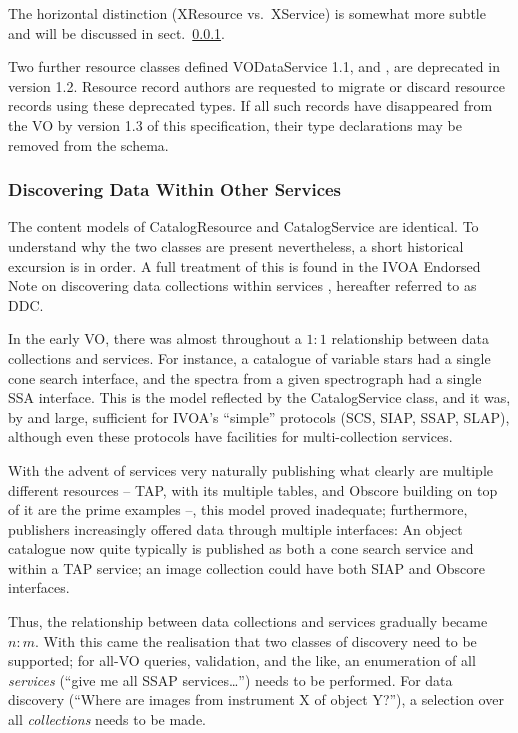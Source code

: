 \documentclass[11pt,a4paper]{ivoa}
\begin{document}
The horizontal distinction (XResource vs.~XService) is somewhat more
subtle and will be discussed in sect.~\ref{sect:discoverdata}.

Two further resource classes defined VODataService 1.1,
 and ,
are deprecated in version 1.2.
Resource record authors are requested to migrate or discard resource
records using these deprecated types.  If all such records have
disappeared from the VO by version 1.3 of this specification, their
type declarations may be removed from the schema.

\subsubsection{Discovering Data Within Other Services}
\label{sect:discoverdata}

The content models of CatalogResource and CatalogService are identical.
To understand why the two classes are present nevertheless, a short
historical excursion is in order.  A full treatment of this is found in
the IVOA Endorsed Note on discovering data collections within services
\citep{2019ivoa.spec.0520D}, hereafter referred to as DDC.

In the early VO, there was almost throughout a $1:1$ relationship between
data collections and services.  For instance, a catalogue of variable
stars had a single cone search interface, and the spectra from a given
spectrograph had a single SSA interface.  This is the model reflected by
the CatalogService class, and it was, by and large, sufficient for
IVOA's ``simple'' protocols (SCS, SIAP, SSAP, SLAP), although even these
protocols have facilities for multi-collection services.

With the advent of services very naturally publishing what clearly
are multiple different resources -- TAP, with its multiple tables, and
Obscore building on top of it are the prime examples --, this model
proved inadequate; furthermore, publishers increasingly offered data
through multiple interfaces: An object catalogue now quite typically is
published as both a cone search service and within a TAP service; an
image collection could have both SIAP and Obscore interfaces.

Thus, the relationship between data collections and services gradually
became $n:m$.  With this came the realisation that two classes of
discovery need to be supported; for all-VO queries, validation, and the
like, an enumeration of all \emph{services} (``give me all SSAP
services\dots'') needs to be performed.  For data discovery (``Where are
images from instrument X of object Y?''), a selection over all
\emph{collections} needs to be made.
\end{document}
